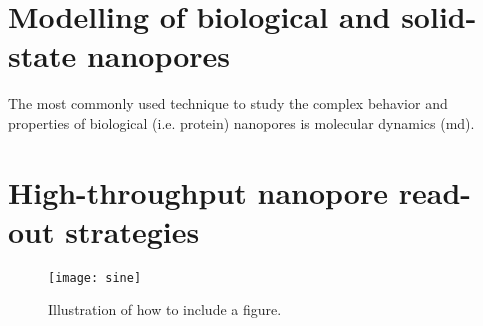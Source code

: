 \section{Modelling of biological and solid-state nanopores}
The most commonly used technique to study the complex behavior and properties of biological (i.e. protein) nanopores is molecular dynamics (\gls{md}).

\section{High-throughput nanopore read-out strategies}



\begin{figure}
  \centering
  \medskip
  \texttt{[image: sine]}
  \caption{Illustration of how to include a figure. }
  \label{fig:sine}
\end{figure}




\cleardoublepage

